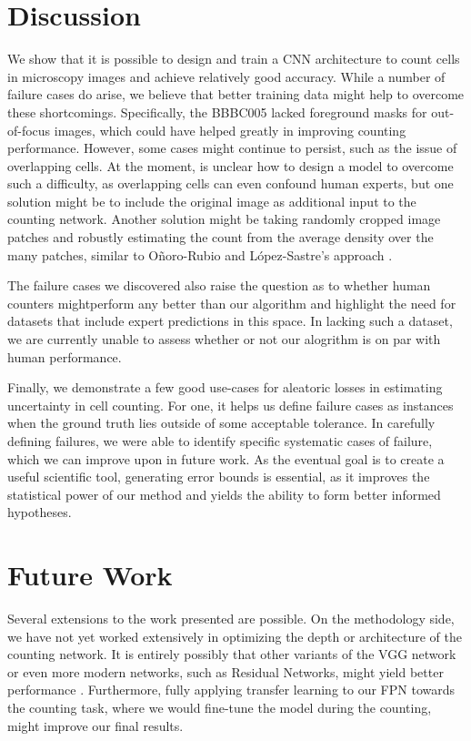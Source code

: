 \documentclass[10pt,twocolumn,letterpaper]{article}
\begin{document}
\section{Discussion}
We show that it is possible to design and train a CNN architecture to count cells in microscopy images
and achieve relatively good accuracy. While a number of failure cases do arise, we believe that
better training data might help to overcome these shortcomings. Specifically, the BBBC005 lacked foreground masks
for out-of-focus images, which could have helped greatly in improving counting performance. However, some cases might
continue to persist, such as the issue of overlapping cells. At the moment, is unclear how to design a model to overcome
such a difficulty, as overlapping cells can even confound human experts, but one solution might be
to include the original image as additional input to the counting network. Another solution might be taking randomly
cropped image patches and robustly estimating the count from the average density over the many patches,
similar to O\~{n}oro-Rubio and L\'{o}pez-Sastre's approach \cite{hydra}.


The failure cases we discovered also raise the question as to whether human counters mightperform any better than our
algorithm and highlight the need for datasets that include expert predictions in this space. In lacking such a dataset,
we are currently unable to assess whether or not our alogrithm is on par with human performance.


Finally, we demonstrate a few good use-cases for aleatoric losses in estimating uncertainty
in cell counting. For one, it helps us define failure cases as instances when the ground truth lies outside of some acceptable tolerance.
In carefully defining failures, we were able to identify specific systematic cases of failure, which we can improve upon in future work.
As the eventual goal is to create a useful scientific tool, generating error bounds is
essential, as it improves the statistical power of our method and yields the ability to form
better informed hypotheses.




\section{Future Work}
Several extensions to the work presented are possible. On the methodology side, we have not yet worked extensively in optimizing the depth or architecture of the counting network.
It is entirely possibly that other variants of the VGG network or even more modern networks, such as Residual Networks, might yield better performance \cite{resnet}.
Furthermore, fully applying transfer learning to our FPN towards the counting task, where we would fine-tune the model during the
counting, might improve our final results.
\end{document}
